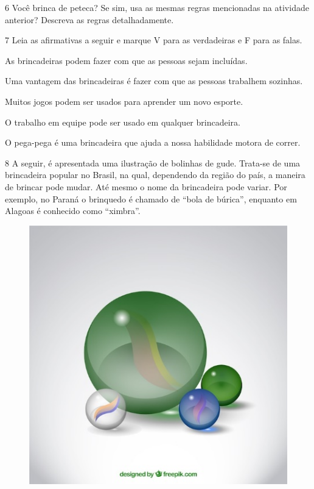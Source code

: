\begin{multicols}{2}





\end{multicols}



\num{6} Você brinca de peteca? Se sim, usa as mesmas regras mencionadas na atividade anterior? Descreva as regras detalhadamente.


\num{7} Leia as afirmativas a seguir e marque V para as verdadeiras e F para
  as falas.

\begin{boxlist}
 As brincadeiras podem fazer com que as pessoas sejam incluídas.

 Uma vantagem das brincadeiras é fazer com que as pessoas trabalhem sozinhas.

 Muitos jogos podem ser usados para aprender um novo esporte.

 O trabalho em equipe pode ser usado em qualquer brincadeira.

 O pega-pega é uma brincadeira que ajuda a nossa habilidade motora de correr.
\end{boxlist}


\num{8} A seguir, é apresentada uma ilustração de bolinhas de gude. Trata-se de uma
  brincadeira popular no Brasil, na qual, dependendo da região do país, a
  maneira de brincar pode mudar. Até mesmo o nome da brincadeira pode variar. Por exemplo, no Paraná o brinquedo é chamado de “bola de búrica”, enquanto em Alagoas
  é conhecido como “ximbra”.

\begin{figure}
\includegraphics[width=.2\textwidth]{./imgs/img10.jpg}
\end{figure}

